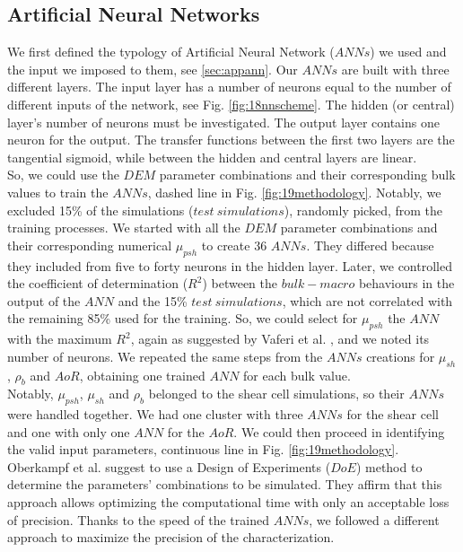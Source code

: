 \documentclass[review]{elsarticle}
\begin{document}
\subsection{Artificial Neural Networks}
\label{subsec:ann}
We first defined the typology of Artificial Neural Network ($ANNs$) we used and
the input we imposed to them, see \ref{sec:appann}.
Our $ANNs$ are built with three different layers. 
The input layer has a number of neurons equal to the number of different inputs
of the network, see Fig. \ref{fig:18nnscheme}.
The hidden (or central) layer's number of neurons must be investigated. 
The output layer contains one neuron for the output.
The transfer functions between the first two layers are the tangential sigmoid, 
while between the hidden and central layers are linear.\\
So, we could use the $DEM$ parameter combinations and their corresponding bulk
values to train the $ANNs$,
dashed line in Fig. \ref{fig:19methodology}.
Notably, we excluded 15\% of the simulations ($test ~ simulations$),
randomly picked, from the training processes.
We started with all the $DEM$ parameter combinations and their corresponding
numerical $\mu_{psh}$ to create 36 $ANNs$.
They differed because they included from five to forty neurons in the hidden
layer.
Later, we controlled the coefficient of determination ($R^2$) between the
$bulk-macro$ behaviours in the output of the $ANN$ and the 15\% $test ~ simulations$, 
which are not correlated with the remaining 85\% used for the training. 
So, we could select for $\mu_{psh}$ the $ANN$ with the maximum $R^2$, 
again as suggested by Vaferi et al. \cite{RefWorks:150}, and we noted its number
of neurons.
We repeated the same steps from the $ANNs$ creations for $\mu_{sh}$, $\rho_b$
and $AoR$, obtaining one trained $ANN$ for each bulk value. \\
Notably, $\mu_{psh}$, $\mu_{sh}$ and $\rho_b$ belonged to the shear cell
simulations, so their $ANNs$ were handled together. 
We had one cluster with three $ANNs$ for the shear cell and one with only one
$ANN$ for the $AoR$.
We could then proceed in identifying the valid input parameters, continuous line
in Fig. \ref{fig:19methodology}.
Oberkampf et al. \cite{RefWorks:160} suggest to use a Design of Experiments
($DoE$) method to determine the parameters' combinations to be simulated.
They affirm that this approach allows optimizing the computational time with
only an acceptable loss of precision.
Thanks to the speed of the trained $ANNs$, we followed a different approach to
maximize the precision of the characterization.
\end{document}

